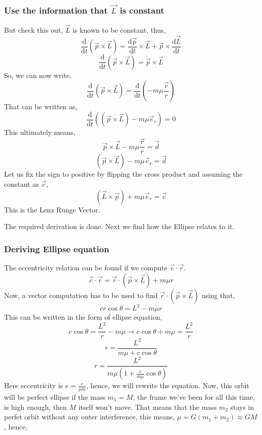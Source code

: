 \documentclass[11pt,a4paper]{article}
\begin{document}
\subsubsection{ Use the information that $\vec{L}$ is constant }
But check this out, $\vec{L}$ is known to  be constant, thus,
\[ 
    \frac{\mathrm{d} }{\mathrm{d} t} \left(  \vec{p} \times  \vec{L} \right) = 
    \frac{\mathrm{d} \vec{p}}{\mathrm{d} t} \times  \vec{L} + 
    \vec{p} \times  \frac{\mathrm{d} \vec{L}}{\mathrm{d} t}
\]
\[ 
    \frac{\mathrm{d} }{\mathrm{d} t} \left( \vec{p} \times  \vec{L} \right) = \dot{\vec{p}}\times  \vec{L}
\]
So, we can now write,
\[ 
    \frac{\mathrm{d} }{\mathrm{d} t} \left( \vec{p} \times  \vec{L} \right) =
    \frac{\mathrm{d} }{\mathrm{d} t}\left( - m \mu \frac{\vec{r}}{r} \right) 
\]
That can be written as,
\[ 
    \frac{\mathrm{d} }{\mathrm{d} t} \left( 
        \left( \vec{p}\times \vec{L} \right) - m \mu \vec{e}_r
    \right)=0 
\]
This ultimately means,
\[ 
\vec{p}\times \vec{L} - m \mu \frac{\vec{r}}{r} =  \vec{d}
\]
\[ 
    \boxed{ \left( \vec{p}\times  \vec{L} \right) - m \mu \vec{e}_r = \vec{d}  }
\]
Let us fix the sign to positive by flipping the cross product and assuming the constant as $\vec{c}$,
\[ 
    \boxed{ \left( \vec{L} \times  \vec{p} \right) + m \mu \vec{e}_r = \vec{c} }
\]
This is the Lenz Runge Vector.

The required derivation is done. Next we find how the Ellipse relates to it.

\subsubsection{ Deriving Ellipse equation }

The eccentricity relation can be found if we compute $\vec{c} \cdot  \vec{r}$.
\[ 
    \vec{c} \cdot  \vec{r} = \vec{r}\cdot  \left( \vec{p}\times \vec{L} \right) + m \mu r 
\]
Now, a vector computation has to be used to find $\vec{r}\cdot  \left( \vec{p}\times \vec{L} \right) $
using that,
\[ 
cr \cos \theta = L^2  -  m \mu r
\]
This can be written in the form of ellipse equation,
\[ 
c \cos \theta = \frac{L^2}{r} - m \mu \to c \cos \theta + m \mu = \frac{L^2}{r}
\]
\[ 
r = \frac{L^2}{ m \mu + c \cos \theta}
\]
\[ 
    r = \frac{L^2}{m \mu \left( 1 + \frac{c}{m \mu} \cos \theta\right) }
\]
Here eccentricity is $e = \frac{c}{\mu m}$, hence, we will rewrite the equation. Now, this orbit will be perfect ellipse if the mass $m_1 = M$, the frame we've been for all this time, is high enough, then $M$ itself won't move. That means that the mass $m_2$ stays in perfet orbit without any outer interference, this means, $\mu = G \left( m_1 + m_2 \right) \approx G M$, hence,
\end{document}
